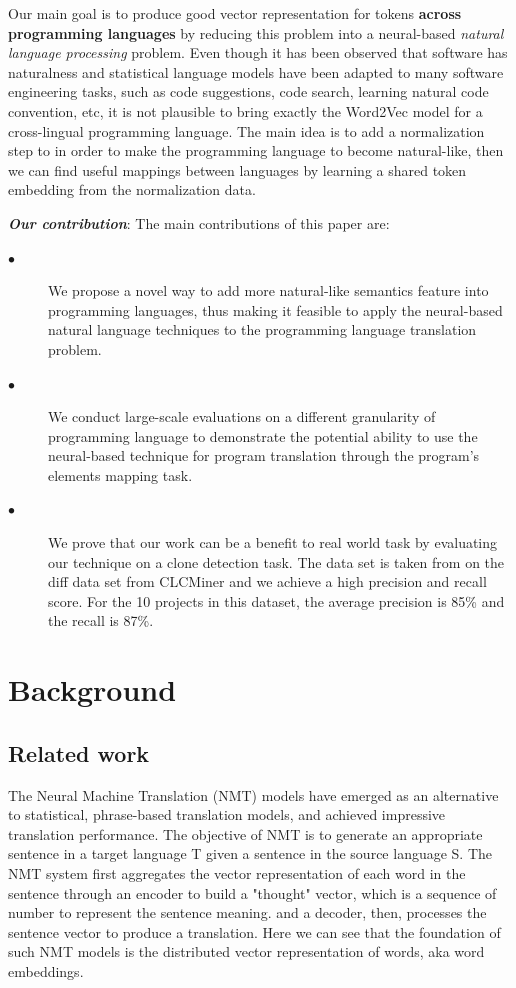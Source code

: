 Our main goal is to produce good vector representation for tokens \textbf{across programming languages} by reducing this problem into a neural-based \textit{natural language processing} problem. Even though it has been observed that software has naturalness \cite{hindle2012naturalness} and statistical language models have been adapted to many software engineering tasks, such as code suggestions, code search, learning natural code convention, etc, it is not plausible to bring exactly the Word2Vec model for a cross-lingual programming language.  The main idea is to add a normalization step to in order to make the programming language to become natural-like, then we can find useful mappings between languages by learning a shared token embedding from the normalization data.

\textbf{\textit{Our contribution}}: The main contributions of this paper are:
\begin{description}
	\item [$\bullet$] We propose a novel way to add more natural-like semantics feature into programming languages, thus making it feasible to apply the neural-based natural language techniques to the programming language translation problem.
	\item [$\bullet$] We conduct large-scale evaluations on a different granularity of programming language to demonstrate the potential ability to use the neural-based technique for program translation through the program's elements mapping task.
	\item [$\bullet$] We prove that our work can be a benefit to real world task by evaluating our technique on a clone detection task. The data set is taken from on the diff data set from CLCMiner \cite{cheng2017clcminer} and we achieve a high precision and recall score. For the 10 projects in this dataset, the average precision is 85\% and the recall is 87\%.
\end{description}
\section{Background}

\subsection{Related work}
The Neural Machine Translation (NMT) models have emerged as an alternative to statistical, phrase-based translation models, and achieved impressive translation performance. The objective of NMT is to generate an appropriate sentence in a target language T given a sentence in the source language S. The NMT system first aggregates the vector representation of each word in the sentence through an encoder to build a "thought" vector, which is a sequence of number to represent the sentence meaning. and a decoder, then, processes the sentence vector to produce a translation. Here we can see that the foundation of such NMT models is the distributed vector representation of words, aka word embeddings.

